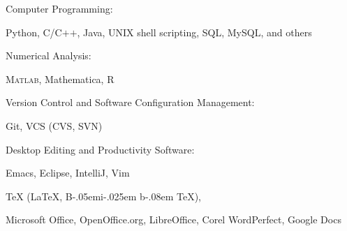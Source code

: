 \documentclass[10pt]{article}
\newcommand{\halfblankline}{\quad\vspace{-0.5\baselineskip}\pagebreak[3]}
\providecommand\BibTeX{{B\kern-.05em{\sc i\kern-.025em b}\kern-.08em \TeX}}
\providecommand\Matlab{\textsc{Matlab}}
\begin{document}
Computer Programming:
%
\begin{innerlist}
\item Python, C/C$+$$+$, Java, UNIX shell scripting, SQL, MySQL, and others
\end{innerlist}

\halfblankline

Numerical Analysis:
%
\begin{innerlist}
    \item \Matlab, Mathematica, R 
\end{innerlist}

\halfblankline

Version Control and Software Configuration Management:
%
\begin{innerlist}
    \item Git, VCS (CVS, SVN)
\end{innerlist}

\halfblankline

%
%

%

%

Desktop Editing and Productivity Software:
%
\begin{innerlist}
    \item Emacs, Eclipse, IntelliJ, Vim
    \item \TeX{} (\LaTeX{}, \BibTeX{}),
    \item Microsoft Office, OpenOffice.org, LibreOffice, Corel
        WordPerfect, Google Docs
\end{innerlist}
\end{document}

